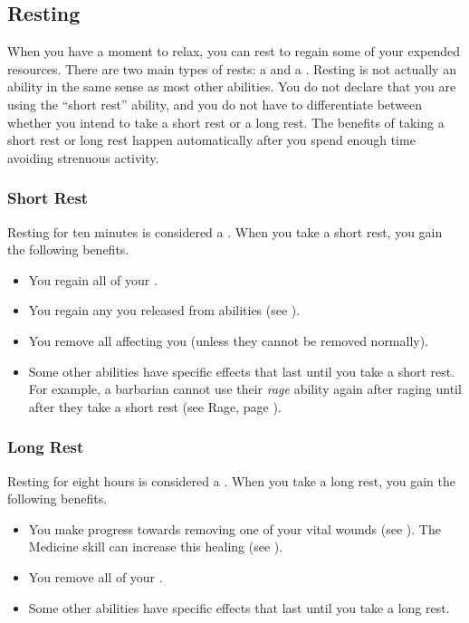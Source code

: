     \subsection{Resting}\label{Resting}
        When you have a moment to relax, you can rest to regain some of your expended resources.
        There are two main types of rests: a  and a .
        Resting is not actually an ability in the same sense as most other abilities.
        You do not declare that you are using the ``short rest'' ability, and you do not have to differentiate between whether you intend to take a short rest or a long rest.
        The benefits of taking a short rest or long rest happen automatically after you spend enough time avoiding strenuous activity.

        \subsubsection{Short Rest}\label{Short Rest}
            Resting for ten minutes is considered a .
            When you take a short rest, you gain the following benefits.
            \begin{itemize}
                \item You regain all of your .
                \item You regain any  you released from  abilities (see ).
                \item You remove all  affecting you (unless they cannot be removed normally).
                \item Some other abilities have specific effects that last until you take a short rest.
                    For example, a barbarian cannot use their \textit{rage} ability again after raging until after they take a short rest (see Rage, page ).
            \end{itemize}

        \subsubsection{Long Rest}\label{Long Rest}
            Resting for eight hours is considered a .
            When you take a long rest, you gain the following benefits.
            \begin{itemize}
                \item You make progress towards removing one of your vital wounds (see ).
                    The Medicine skill can increase this healing (see ).
                \item You remove all of your .
                \item Some other abilities have specific effects that last until you take a long rest.
            \end{itemize}


